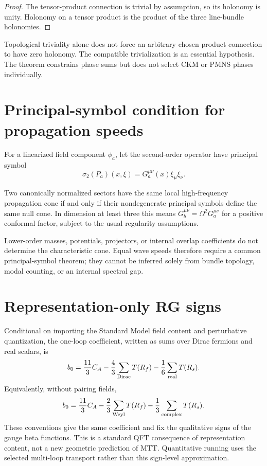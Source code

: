 \documentclass[11pt]{article}
\begin{document}
\begin{proof}
The tensor-product connection is trivial by assumption, so its holonomy is
unity. Holonomy on a tensor product is the product of the three line-bundle
holonomies.
\end{proof}

Topological triviality alone does not force an arbitrary chosen product
connection to have zero holonomy. The compatible trivialization is an essential
hypothesis. The theorem constrains phase sums but does not select CKM or PMNS
phases individually.

\section{Principal-symbol condition for propagation speeds}

For a linearized field component $\phi_a$, let the second-order operator have
principal symbol
\[
\sigma_2(P_a)(x,\xi)=G_a^{\mu\nu}(x)\xi_\mu\xi_\nu.
\]

\begin{theorem}
Two canonically normalized sectors have the same local high-frequency
propagation cone if and only if their nondegenerate principal symbols define
the same null cone. In dimension at least three this means
$G_b^{\mu\nu}=\Omega^2G_a^{\mu\nu}$ for a positive conformal factor, subject to
the usual regularity assumptions.
\end{theorem}

Lower-order masses, potentials, projectors, or internal overlap coefficients do
not determine the characteristic cone. Equal wave speeds therefore require a
common principal-symbol theorem; they cannot be inferred solely from bundle
topology, modal counting, or an internal spectral gap.

\section{Representation-only RG signs}

Conditional on importing the Standard Model field content and perturbative
quantization, the one-loop coefficient, written as sums over Dirac fermions
and real scalars, is
\[
b_0=\frac{11}{3}C_A-\frac{4}{3}\sum_{\rm Dirac}T(R_f)
-\frac{1}{6}\sum_{\rm real}T(R_s).
\]
Equivalently, without pairing fields,
\[
b_0=\frac{11}{3}C_A-\frac{2}{3}\sum_{\rm Weyl}T(R_f)
-\frac{1}{3}\sum_{\rm complex}T(R_s).
\]
These conventions give the same coefficient and fix the qualitative signs of
the gauge beta functions. This is a standard
QFT consequence of representation content, not a new geometric prediction of
MTT. Quantitative running uses the selected multi-loop transport rather than
this sign-level approximation.
\end{document}
